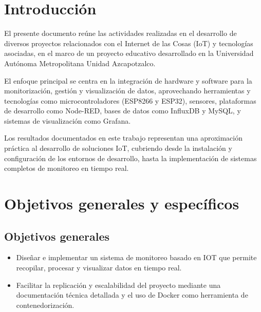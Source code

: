 \setcounter{page}{1}

\setcounter{section}{5}

\section{Introducción}

El presente documento reúne las actividades realizadas en el desarrollo de diversos proyectos relacionados con el Internet de las Cosas (IoT) y tecnologías asociadas, en el marco de un proyecto educativo desarrollado en la Universidad Autónoma Metropolitana Unidad Azcapotzalco.

El enfoque principal se centra en la integración de hardware y software para la monitorización, gestión y visualización de datos, aprovechando herramientas y tecnologías como microcontroladores (ESP8266 y ESP32), sensores, plataformas de desarrollo como Node-RED, bases de datos como InfluxDB y MySQL, y sistemas de visualización como Grafana.

Los resultados documentados en este trabajo representan una aproximación práctica al desarrollo de soluciones IoT, cubriendo desde la instalación y configuración de los entornos de desarrollo, hasta la implementación de sistemas completos de monitoreo en tiempo real.

\section{Objetivos generales y específicos}
    \subsection*{Objetivos generales}
    \begin{itemize}
        \item Diseñar e implementar un sistema de monitoreo basado en IOT que permite recopilar, procesar y visualizar datos en tiempo real.
        \item Facilitar la replicación y escalabilidad del proyecto mediante una documentación técnica detallada y el uso de Docker como herramienta de contenedorización.
    \end{itemize}

